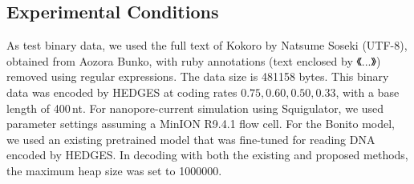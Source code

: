 \documentclass[sotsuron]{kuee}
\begin{document}
\subsection{Experimental Conditions}
As test binary data, we used the full text of Kokoro by Natsume Soseki
(UTF-8), obtained from Aozora Bunko, with ruby annotations (text enclosed by
《...》) removed using regular expressions\cite{kokoro}.
The data size is 481158 bytes.
This binary data was encoded by HEDGES at coding rates
$0.75,0.60,0.50,0.33$, with a base length of 400\,nt.
For nanopore-current simulation using Squigulator, we used parameter settings
assuming a MinION R9.4.1 flow cell\cite{squigulator}.
For the Bonito model, we used an existing pretrained model%
that was fine-tuned for reading DNA encoded by HEDGES\cite{bonito}.
In decoding with both the existing and proposed methods, the maximum heap size
was set to 1000000.
\end{document}
